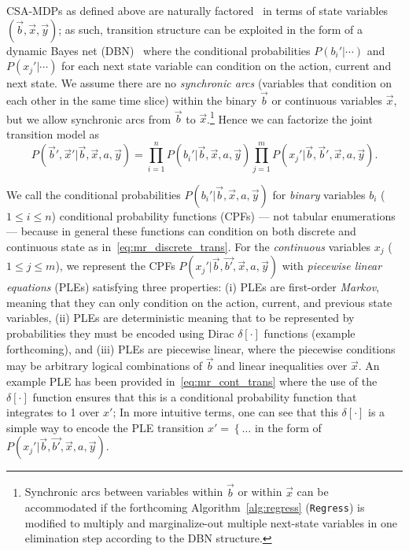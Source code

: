 CSA-MDPs as defined above are naturally factored~\cite{boutilier99dt}
in terms of state variables $(\vec{b},\vec{x},\vec{y})$; as such,
transition structure can be exploited in the form of a dynamic Bayes
net (DBN)~\cite{dbn} where the conditional probabilities
$P(b_i'|\cdots)$ and $P(x_j'|\cdots)$ for each next state variable can
condition on the action, current and next state.  We assume
there are no \emph{synchronic arcs} (variables that condition on each
other in the same time slice) within the binary $\vec{b}$ or
continuous variables $\vec{x}$, but we allow synchronic arcs from
$\vec{b}$ to $\vec{x}$.\footnote{Synchronic arcs between variables
within $\vec{b}$ or within $\vec{x}$ can be accommodated if the
forthcoming Algorithm~\ref{alg:regress} (\texttt{Regress}) is modified
to multiply and marginalize-out multiple next-state variables in one
elimination step according to the DBN structure.}  Hence we can factorize 
the joint transition model as
{\footnotesize
\begin{equation}
P(\vec{b}',\vec{x}'|\vec{b},\vec{x},a,\vec{y}) = 
\prod_{i=1}^n P(b_i'|\vec{b},\vec{x},a,\vec{y}) \prod_{j=1}^m P(x_j'|\vec{b},\vec{b}',\vec{x},a,\vec{y}). \nonumber %
\end{equation}}

We call the conditional probabilities
$P(b_i'|\vec{b},\vec{x},a,\vec{y})$ for \emph{binary} variables $b_i$
($1 \leq i \leq n$) conditional probability functions (CPFs) --- not
tabular enumerations --- because in general these functions can
condition on both discrete and continuous state as
in~\eqref{eq:mr_discrete_trans}.  For the \emph{continuous} variables
$x_j$ ($1 \leq j \leq m$), we represent the CPFs
$P(x_j'|\vec{b},\vec{b'},\vec{x},a,\vec{y})$ with \emph{piecewise
linear equations} (PLEs) satisfying three properties: (i) PLEs are
first-order \emph{Markov}, meaning that they can only condition on the
action, current, and previous state variables, (ii) PLEs are
deterministic meaning that to be represented by probabilities they
must be encoded using Dirac $\delta[\cdot]$ functions (example
forthcoming), and (iii) PLEs are piecewise linear, where the piecewise
conditions may be arbitrary logical combinations of $\vec{b}$ and
linear inequalities over $\vec{x}$.  An example PLE has been
provided in~\eqref{eq:mr_cont_trans} where the use of the 
$\delta[\cdot]$ function ensures that this is a conditional
probability function that integrates to 1 over $x'$; In more intuitive
terms, one can see that this $\delta[\cdot]$ is a simple way to encode
the PLE transition $x' = \left\{ \ldots \right.$ in the form of 
$P(x_j'|\vec{b},\vec{b'},\vec{x},a,\vec{y})$.

